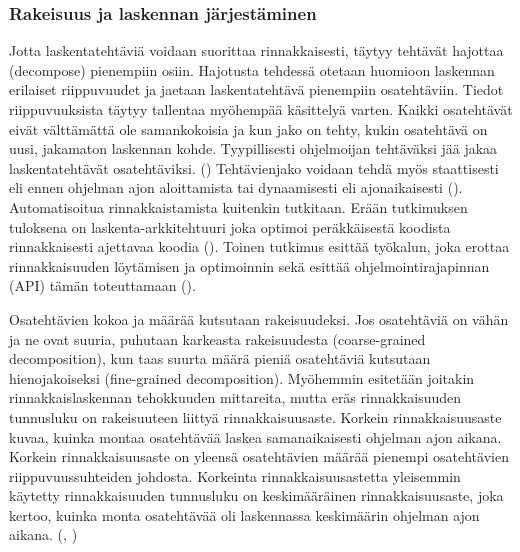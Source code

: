 \subsubsection{Rakeisuus ja laskennan järjestäminen}

Jotta laskentatehtäviä voidaan suorittaa rinnakkaisesti, täytyy tehtävät
hajottaa (decompose) pienempiin osiin. Hajotusta tehdessä otetaan huomioon laskennan
erilaiset riippuvuudet ja jaetaan laskentatehtävä pienempiin osatehtäviin.
Tiedot riippuvuuksista täytyy tallentaa myöhempää käsittelyä varten.
Kaikki osatehtävät eivät välttämättä ole samankokoisia ja kun jako on tehty,
kukin osatehtävä on uusi, jakamaton laskennan kohde. Tyypillisesti ohjelmoijan
tehtäväksi jää jakaa laskentatehtävät osatehtäviksi. (\citealt{intro})
Tehtävienjako voidaan tehdä myös staattisesti eli ennen ohjelman ajon
aloittamista tai dynaamisesti eli ajonaikaisesti (\citealt{rauber}).
Automatisoitua rinnakkaistamista kuitenkin tutkitaan. Erään tutkimuksen
tuloksena on laskenta-arkkitehtuuri joka optimoi peräkkäisestä koodista
rinnakkaisesti ajettavaa koodia (\citealt{apopei}). Toinen tutkimus esittää
työkalun, joka erottaa rinnakkaisuuden löytämisen ja optimoinnin sekä esittää
ohjelmointirajapinnan (API) tämän toteuttamaan (\citealt{dope}).

Osatehtävien kokoa ja määrää kutsutaan rakeisuudeksi. Jos osatehtäviä on vähän
ja ne ovat suuria, puhutaan karkeasta rakeisuudesta (coarse-grained
decomposition), kun taas suurta määrä pieniä osatehtäviä kutsutaan
hienojakoiseksi (fine-grained decomposition). Myöhemmin esitetään joitakin
rinnakkaislaskennan tehokkuuden mittareita, mutta eräs rinnakkaisuuden
tunnusluku on rakeisuuteen liittyä rinnakkaisuusaste. Korkein 
rinnakkaisuusaste kuvaa, kuinka montaa osatehtävää laskea samanaikaisesti
ohjelman ajon aikana. Korkein rinnakkaisuusaste on yleensä osatehtävien määrää
pienempi osatehtävien riippuvuussuhteiden johdosta. Korkeinta
rinnakkaisuusastetta yleisemmin käytetty rinnakkaisuuden tunnusluku on
keskimääräinen rinnakkaisuusaste, joka kertoo, kuinka monta osatehtävää oli
laskennassa keskimäärin ohjelman ajon aikana. (\citealt{intro}, \citealt{rauber})

